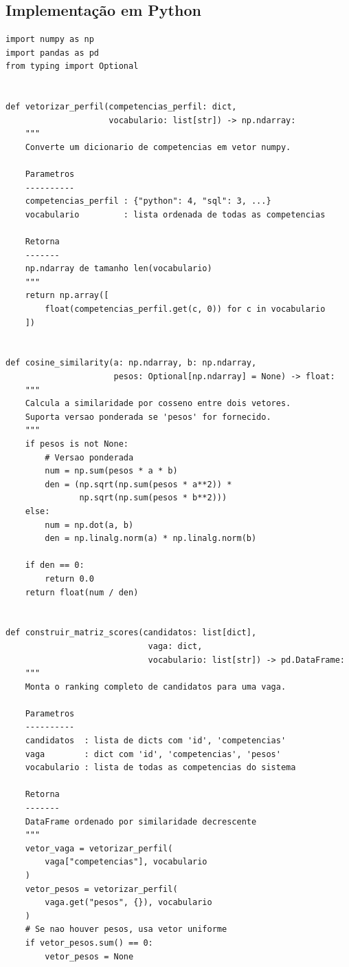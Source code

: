 \documentclass[12pt,a4paper]{article}
\begin{document}
\subsection{Implementação em Python}

\begin{lstlisting}[caption={Cosine Similarity para matching de vagas e candidatos},
                   label={lst:cosine}]
import numpy as np
import pandas as pd
from typing import Optional


def vetorizar_perfil(competencias_perfil: dict,
                     vocabulario: list[str]) -> np.ndarray:
    """
    Converte um dicionario de competencias em vetor numpy.

    Parametros
    ----------
    competencias_perfil : {"python": 4, "sql": 3, ...}
    vocabulario         : lista ordenada de todas as competencias

    Retorna
    -------
    np.ndarray de tamanho len(vocabulario)
    """
    return np.array([
        float(competencias_perfil.get(c, 0)) for c in vocabulario
    ])


def cosine_similarity(a: np.ndarray, b: np.ndarray,
                      pesos: Optional[np.ndarray] = None) -> float:
    """
    Calcula a similaridade por cosseno entre dois vetores.
    Suporta versao ponderada se 'pesos' for fornecido.
    """
    if pesos is not None:
        # Versao ponderada
        num = np.sum(pesos * a * b)
        den = (np.sqrt(np.sum(pesos * a**2)) *
               np.sqrt(np.sum(pesos * b**2)))
    else:
        num = np.dot(a, b)
        den = np.linalg.norm(a) * np.linalg.norm(b)

    if den == 0:
        return 0.0
    return float(num / den)


def construir_matriz_scores(candidatos: list[dict],
                             vaga: dict,
                             vocabulario: list[str]) -> pd.DataFrame:
    """
    Monta o ranking completo de candidatos para uma vaga.

    Parametros
    ----------
    candidatos  : lista de dicts com 'id', 'competencias'
    vaga        : dict com 'id', 'competencias', 'pesos'
    vocabulario : lista de todas as competencias do sistema

    Retorna
    -------
    DataFrame ordenado por similaridade decrescente
    """
    vetor_vaga = vetorizar_perfil(
        vaga["competencias"], vocabulario
    )
    vetor_pesos = vetorizar_perfil(
        vaga.get("pesos", {}), vocabulario
    )
    # Se nao houver pesos, usa vetor uniforme
    if vetor_pesos.sum() == 0:
        vetor_pesos = None


\end{lstlisting}
\end{document}
